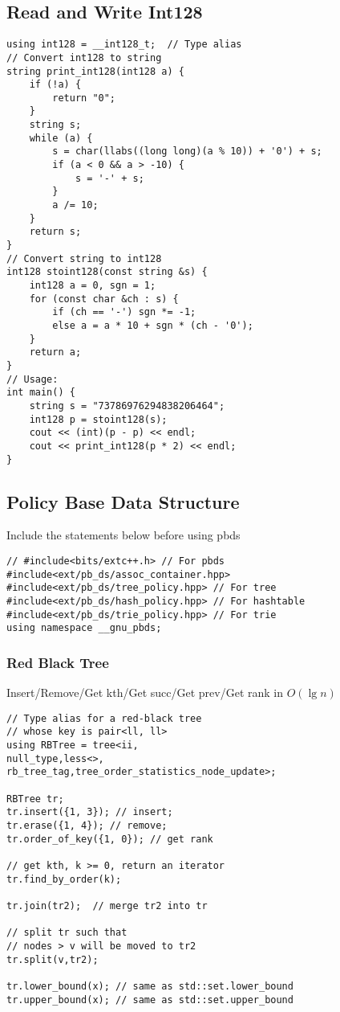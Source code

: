 \documentclass[10pt]{article}{\twocolumn}
\begin{document}
\subsection{Read and Write Int128}
\begin{lstlisting}
using int128 = __int128_t;  // Type alias
// Convert int128 to string
string print_int128(int128 a) {
    if (!a) {
        return "0";
    }
    string s;
    while (a) {
        s = char(llabs((long long)(a % 10)) + '0') + s;
        if (a < 0 && a > -10) {
            s = '-' + s;
        }
        a /= 10;
    }
    return s;
}
// Convert string to int128
int128 stoint128(const string &s) {
    int128 a = 0, sgn = 1;
    for (const char &ch : s) {
        if (ch == '-') sgn *= -1;
        else a = a * 10 + sgn * (ch - '0');
    }
    return a;
}
// Usage:
int main() {
    string s = "73786976294838206464";
    int128 p = stoint128(s);
    cout << (int)(p - p) << endl;
    cout << print_int128(p * 2) << endl;
}
\end{lstlisting}
\subsection{Policy Base Data Structure}
Include the statements below before using pbds
\begin{lstlisting}
// #include<bits/extc++.h> // For pbds
#include<ext/pb_ds/assoc_container.hpp>
#include<ext/pb_ds/tree_policy.hpp> // For tree
#include<ext/pb_ds/hash_policy.hpp> // For hashtable
#include<ext/pb_ds/trie_policy.hpp> // For trie
using namespace __gnu_pbds;
\end{lstlisting}
\subsubsection{Red Black Tree}
Insert/Remove/Get kth/Get succ/Get prev/Get rank in $O(\lg{n})$
\begin{lstlisting}
// Type alias for a red-black tree 
// whose key is pair<ll, ll>
using RBTree = tree<ii,
null_type,less<>,
rb_tree_tag,tree_order_statistics_node_update>;

RBTree tr;
tr.insert({1, 3}); // insert;
tr.erase({1, 4}); // remove;
tr.order_of_key({1, 0}); // get rank

// get kth, k >= 0, return an iterator
tr.find_by_order(k);

tr.join(tr2);  // merge tr2 into tr

// split tr such that 
// nodes > v will be moved to tr2
tr.split(v,tr2);

tr.lower_bound(x); // same as std::set.lower_bound
tr.upper_bound(x); // same as std::set.upper_bound
\end{lstlisting}
\end{document}
